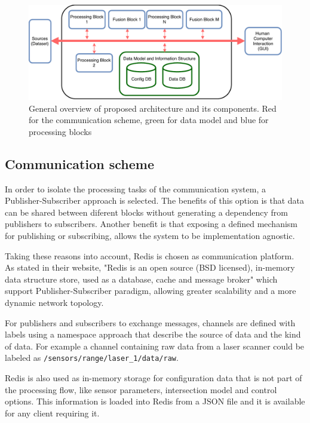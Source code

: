 \begin{figure}[ht!]
\centering
\includegraphics[scale=0.7]{fig/3/proposal_blocks.pdf}
\caption{General overview of proposed architecture and its components. Red for the communication scheme, green for data model and blue for processing blocks}
\label{proposal_blocks}
\end{figure} 



\subsection{Communication scheme}

In order to isolate the processing tasks of the communication system, a Publisher-Subscriber approach is selected. The benefits of this option is that data can be shared between diferent blocks without generating a dependency from publishers to subscribers. Another benefit is that exposing a defined mechanism for publishing or subscribing, allows the system to be implementation agnostic.

Taking these reasons into account, Redis is chosen as communication platform. As stated in their website, "Redis is an open source (BSD licensed), in-memory data structure store, used as a database, cache and message broker"\cite{Redis} which support Publisher-Subscriber paradigm, allowing greater scalability and a more dynamic network topology.

For publishers and subscribers to exchange messages, channels are defined with labels using a namespace approach that describe the source of data and the kind of data. For example a channel containing raw data from a laser scanner could be labeled as \texttt{/sensors/range/laser\_1/data/raw}.

Redis is also used as in-memory storage for configuration data that is not part of the processing flow, like sensor parameters, intersection model and control options. This information is loaded into Redis from a JSON file and it is available for any client requiring it.


